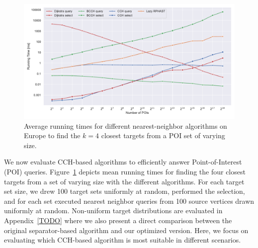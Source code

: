 \documentclass[a4paper, english, cleveref]{lipics-v2021}
\begin{document}
\begin{figure}
\centering
\includegraphics[width=\linewidth]{fig/knn.pdf}
\caption{
Average running times for different nearest-neighbor algorithms on Europe to find the $k=4$ closest targets from a POI set of varying size.
}\label{fig:knn}
\end{figure}

We now evaluate CCH-based algorithms to efficiently answer Point-of-Interest (POI) queries.
Figure~\ref{fig:knn} depicts mean running times for finding the four closest targets from a set of varying size with the different algorithms.
For each target set size, we drew 100 target sets uniformly at random, performed the selection, and for each set executed nearest neighbor queries from 100 source vertices drawn uniformly at random.
Non-uniform target distributions are evaluated in Appendix~\ref{TODO} where we also present a direct comparison between the original separator-based algorithm and our optimized version.
Here, we focus on evaluating which CCH-based algorithm is most suitable in different scenarios.
\end{document}
